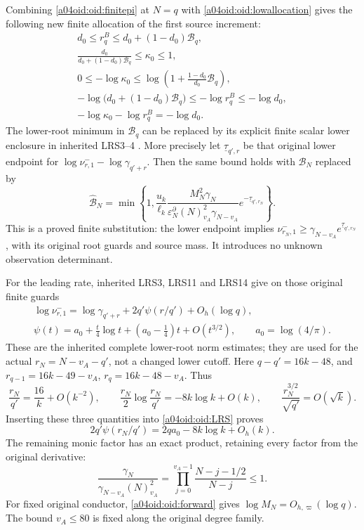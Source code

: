 Combining \eqref{a04oid:oid:finitepi} at $N=q$ with
\eqref{a04oid:oid:lowallocation} gives the following new finite allocation
of the first source increment:
\begin{equation}\label{a04oid:oid:finiteallocation}
 \boxed{\begin{gathered}
 d_0\le r_q^B\le d_0+(1-d_0)\mathcal B_q,\\
 \frac{d_0}{d_0+(1-d_0)\mathcal B_q}\le\kappa_0\le1,\\
 0\le-\log\kappa_0
 \le\log\left(1+\frac{1-d_0}{d_0}\mathcal B_q\right),\\
 -\log\bigl(d_0+(1-d_0)\mathcal B_q\bigr)
 \le-\log r_q^B\le-\log d_0,\\
 -\log\kappa_0-\log r_q^B=-\log d_0.
 \end{gathered}}
\end{equation}
The lower-root minimum in $\mathcal B_q$ can be replaced by its
explicit finite scalar lower enclosure in inherited LRS3--4
\cite{a04oid:InheritedLRS}. More precisely let
$\underline\tau_{q',r}$ be that original lower endpoint for
$\log\nu^-_{r,1}-\log\gamma_{q'+r}$. Then the same bound holds
with $\mathcal B_N$ replaced by
\begin{equation}\label{a04oid:oid:evaluatedfinitepi}
 \widehat{\mathcal B}_N=
 \min\left\{1,\frac{u_k}{\ell_k}
 \frac{M_N^2\gamma_N}
 {\varepsilon_N^\partial(N)_{v_A}^2\gamma_{N-v_A}}
 e^{-\underline\tau_{q',r_N}}\right\}.
\end{equation}
This is a proved finite substitution: the lower endpoint implies
$\nu^-_{r_N,1}\ge\gamma_{N-v_A}
e^{\underline\tau_{q',r_N}}$, with its original root guards and
source mass. It introduces no unknown observation determinant.

For the leading rate, inherited LRS3, LRS11 and LRS14
\cite{a04oid:InheritedLRS} give on those original finite guards
\begin{equation}\label{a04oid:oid:LRS}
 \begin{gathered}
 \log\nu^-_{r,1}=\log\gamma_{q'+r}+2q'\psi(r/q')+O_h(\log q),\\
 \psi(t)=a_0+\frac t4\log t+(a_0-\tfrac14)t+O(t^{3/2}),
 \qquad a_0=\log(4/\pi).
 \end{gathered}
\end{equation}
These are the inherited complete lower-root norm estimates; they
are used for the actual $r_N=N-v_A-q'$, not a changed lower cutoff.
Here $q-q'=16k-48$, and
$r_{q-1}=16k-49-v_A$, $r_q=16k-48-v_A$. Thus
\[
 \frac{r_N}{q'}=\frac{16}{k}+O(k^{-2}),\qquad
 \frac{r_N}{2}\log\frac{r_N}{q'}=-8k\log k+O(k),\qquad
 \frac{r_N^{3/2}}{\sqrt{q'}}=O(\sqrt k).
\]
Inserting these three quantities into \eqref{a04oid:oid:LRS} proves
\begin{equation}\label{a04oid:oid:profile}
 2q'\psi(r_N/q')=2qa_0-8k\log k+O_h(k).
\end{equation}
The remaining monic factor has an exact product, retaining every
factor from the original derivative:
\[
 \frac{\gamma_N}{\gamma_{N-v_A}(N)_{v_A}^2}
 =\prod_{j=0}^{v_A-1}\frac{N-j-1/2}{N-j}\le1.
\]
For fixed original conductor, \eqref{a04oid:oid:forward} gives
$\log M_N=O_{h,\varpi}(\log q)$. The bound $v_A\le80$
is fixed along the original degree family.

